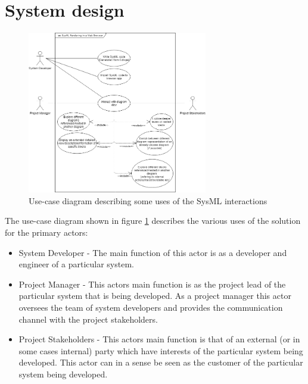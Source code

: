 \documentclass{article}
\begin{document}
\section{System design}

\begin{figure}[H]
    \begin{center}
        \includegraphics[width=0.7\textwidth]{Use-case_SysMLProject_first-draft.png}
        \caption{Use-case diagram describing some uses of the SysML interactions}
        \label{use-case}
    \end{center}
\end{figure}

The use-case diagram shown in figure \ref{use-case} describes the various uses of the solution for the primary actors: 
\begin{itemize}
  \item System Developer - The main function of this actor is as a developer and engineer of a particular system. 
  \item Project Manager - This actors main function is as the project lead of the particular system that is being developed. As a project manager this actor oversees the team of system developers and provides the communication channel with the project stakeholders.
  \item Project Stakeholders - This actors main function is that of an external (or in some cases internal) party which have interests of the particular system being developed. This actor can in a sense be seen as the customer of the particular system being developed.
\end{itemize}



\printbibliography
\end{document}
